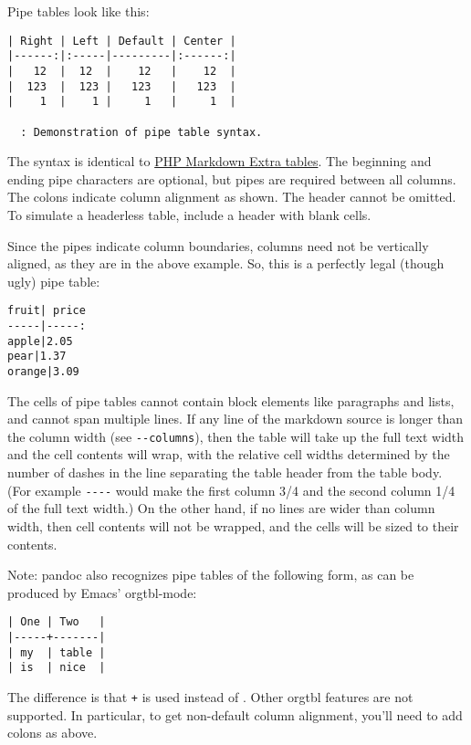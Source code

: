 Pipe tables look like this:

\begin{verbatim}
| Right | Left | Default | Center |
|------:|:-----|---------|:------:|
|   12  |  12  |    12   |    12  |
|  123  |  123 |   123   |   123  |
|    1  |    1 |     1   |     1  |

  : Demonstration of pipe table syntax.
\end{verbatim}

The syntax is identical to
\href{https://michelf.ca/projects/php-markdown/extra/\#table}{PHP
Markdown Extra tables}. The beginning and ending pipe characters are
optional, but pipes are required between all columns. The colons
indicate column alignment as shown. The header cannot be omitted. To
simulate a headerless table, include a header with blank cells.

Since the pipes indicate column boundaries, columns need not be
vertically aligned, as they are in the above example. So, this is a
perfectly legal (though ugly) pipe table:

\begin{verbatim}
fruit| price
-----|-----:
apple|2.05
pear|1.37
orange|3.09
\end{verbatim}

The cells of pipe tables cannot contain block elements like paragraphs
and lists, and cannot span multiple lines. If any line of the markdown
source is longer than the column width (see \texttt{-\/-columns}), then
the table will take up the full text width and the cell contents will
wrap, with the relative cell widths determined by the number of dashes
in the line separating the table header from the table body. (For
example \texttt{-\/-\/-\textbar{}-} would make the first column 3/4 and
the second column 1/4 of the full text width.) On the other hand, if no
lines are wider than column width, then cell contents will not be
wrapped, and the cells will be sized to their contents.

Note: pandoc also recognizes pipe tables of the following form, as can
be produced by Emacs' orgtbl-mode:

\begin{verbatim}
| One | Two   |
|-----+-------|
| my  | table |
| is  | nice  |
\end{verbatim}

The difference is that \texttt{+} is used instead of
\texttt{\textbar{}}. Other orgtbl features are not supported. In
particular, to get non-default column alignment, you'll need to add
colons as above.

